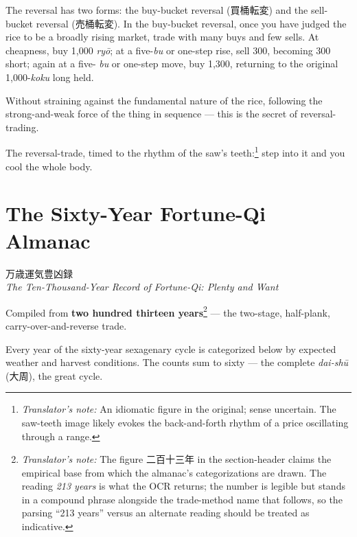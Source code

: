 \documentclass[10pt, openany]{book}
\newcommand{\jp}[1]{{\japanesefont #1}}
\newcommand{\tn}[1]{\footnote{\textit{Translator's note:} #1}}
\begin{document}
The reversal has two forms: the buy-bucket reversal
(\jp{買桶転変}) and the sell-bucket reversal (\jp{売桶転変}). In
the buy-bucket reversal, once you have judged the rice to be a
broadly rising market, trade with many buys and few sells. At
cheapness, buy 1,000 \textit{ry\=o}; at a five-\textit{bu} or
one-step rise, sell 300, becoming 300 short; again at a five-
\textit{bu} or one-step move, buy 1,300, returning to the
original 1,000-\textit{koku} long held.

Without straining against the fundamental nature of the rice,
following the strong-and-weak force of the thing in sequence ---
this is the secret of reversal-trading.

The reversal-trade, timed to the rhythm of the saw's teeth:\tn{An
idiomatic figure in the original; sense uncertain. The saw-teeth
image likely evokes the back-and-forth rhythm of a price oscillating
through a range.} step into it and you cool the whole body.

\chapter{The Sixty-Year Fortune-Qi Almanac}

\begin{center}
\jp{万歳運気豊凶録}\\[0.3em]
\textit{The Ten-Thousand-Year Record of Fortune-Qi: Plenty and Want}
\end{center}

Compiled from \textbf{two hundred thirteen years}\tn{The figure
\jp{二百十三年} in the section-header claims the empirical base
from which the almanac's categorizations are drawn. The reading
\textit{213 years} is what the OCR returns; the number is legible
but stands in a compound phrase alongside the trade-method name
that follows, so the parsing ``213 years'' versus an alternate
reading should be treated as indicative.} --- the two-stage,
half-plank, carry-over-and-reverse trade.

Every year of the sixty-year sexagenary cycle is categorized below
by expected weather and harvest conditions. The counts sum to
sixty --- the complete \textit{dai-sh\=u} (\jp{大周}), the great
cycle.
\end{document}
